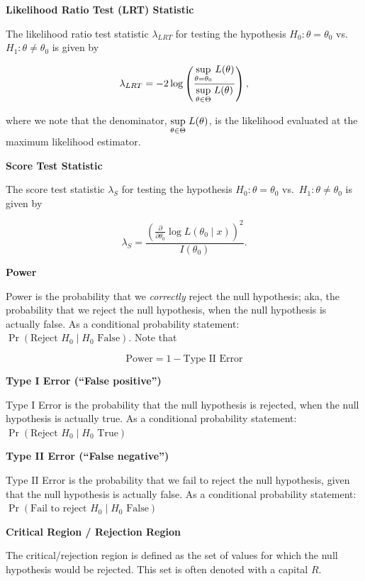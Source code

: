 \documentclass[
  letterpaper,
  DIV=11,
  numbers=noendperiod]{scrreprt}
\begin{document}
\textbf{Likelihood Ratio Test (LRT) Statistic}

The likelihood ratio test statistic \(\lambda_{LRT}\) for testing the
hypothesis \(H_0: \theta = \theta_0\) vs.~\(H_1: \theta \neq \theta_0\)
is given by

\[
\lambda_{LRT} = -2 \log\left(\frac{\underset{\theta = \theta_0}{\text{sup}} \hspace{1mm} L(\theta)}{\underset{\theta \in \Theta}{\text{sup}} \hspace{1mm} L(\theta)}\right),
\]

where we note that the denominator,
\(\underset{\theta \in \Theta}{\text{sup}} \hspace{1mm} L(\theta)\), is
the likelihood evaluated at the maximum likelihood estimator.

\textbf{Score Test Statistic}

The score test statistic \(\lambda_S\) for testing the hypothesis
\(H_0: \theta = \theta_0\) vs.~\(H_1: \theta \neq \theta_0\) is given by

\[
\lambda_S = \frac{\left( \frac{\partial}{\partial \theta_0} \log L(\theta_0 \mid x) \right)^2}{I(\theta_0)}.
\]

\textbf{Power}

Power is the probability that we \emph{correctly} reject the null
hypothesis; aka, the probability that we reject the null hypothesis,
when the null hypothesis is actually false. As a conditional probability
statement: \(\Pr(\text{Reject }H_0 \mid H_0 \text{ False})\). Note that

\[
\text{Power} = 1 - \text{Type II Error}
\]

\textbf{Type I Error (``False positive'')}

Type I Error is the probability that the null hypothesis is rejected,
when the null hypothesis is actually true. As a conditional probability
statement: \(\Pr(\text{Reject }H_0 \mid H_0 \text{ True})\)

\textbf{Type II Error (``False negative'')}

Type II Error is the probability that we fail to reject the null
hypothesis, given that the null hypothesis is actually false. As a
conditional probability statement:
\(\Pr(\text{Fail to reject }H_0 \mid H_0 \text{ False})\)

\textbf{Critical Region / Rejection Region}

The critical/rejection region is defined as the set of values for which
the null hypothesis would be rejected. This set is often denoted with a
capital \(R\).
\end{document}
